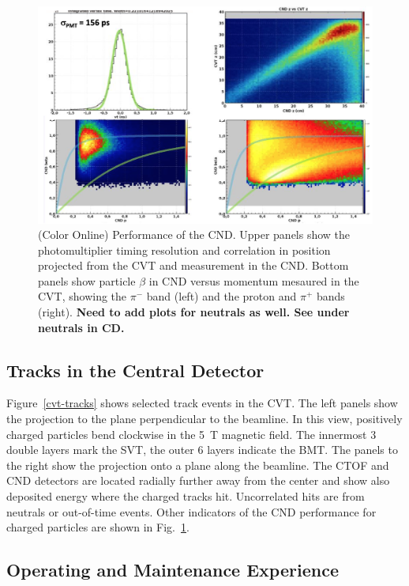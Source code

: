 \documentclass[final,3p,twocolumn]{elsarticle}
\begin{document}
\begin{figure}[htbp!]
\centerline{\includegraphics[width=1.0\columnwidth]{cnd-performance.png}}
\caption{(Color Online) Performance of the CND. Upper panels show the photomultiplier timing resolution and correlation in position
projected from the CVT and measurement in the CND. Bottom panels show particle $\beta$ in CND versus momentum
mesaured in the CVT, showing the $\pi^-$ band (left) and the proton and $\pi^+$ bands (right). {\bf Need to add plots for neutrals
as well. See under neutrals in CD.}}
\label{cnd-performance}
\end{figure}

\subsection{Tracks in the Central Detector}

Figure~\ref{cvt-tracks} shows selected track events in the CVT. The left panels show the projection to the plane
perpendicular to the beamline. In this view, positively charged particles bend clockwise in the 5~T magnetic field.
The innermost 3 double layers mark the SVT, the outer 6 layers indicate the BMT. The panels to the right show the
projection onto a plane along the beamline. The CTOF and CND detectors are located radially further away from
the center and show also deposited energy where the charged tracks hit. Uncorrelated hits are from neutrals or
out-of-time events. Other indicators of the CND performance for charged particles are shown in
Fig.~\ref{cnd-performance}.  

\subsection{Operating and Maintenance Experience}
\end{document}
